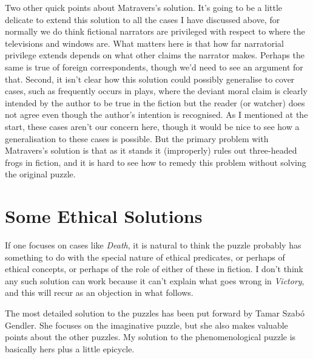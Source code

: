 \documentclass[
  10pt,
  letterpaper,
  DIV=11,
  numbers=noendperiod,
  twoside]{scrartcl}
\begin{document}
Two other quick points about Matravers's solution. It's going to be a
little delicate to extend this solution to all the cases I have
discussed above, for normally we do think fictional narrators are
privileged with respect to where the televisions and windows are. What
matters here is that how far narratorial privilege extends depends on
what other claims the narrator makes. Perhaps the same is true of
foreign correspondents, though we'd need to see an argument for that.
Second, it isn't clear how this solution could possibly generalise to
cover cases, such as frequently occurs in plays, where the deviant moral
claim is clearly intended by the author to be true in the fiction but
the reader (or watcher) does not agree even though the author's
intention is recognised. As I mentioned at the start, these cases aren't
our concern here, though it would be nice to see how a generalisation to
these cases is possible. But the primary problem with Matravers's
solution is that as it stands it (improperly) rules out three-headed
frogs in fiction, and it is hard to see how to remedy this problem
without solving the original puzzle.

\section{Some Ethical Solutions}\label{some-ethical-solutions}

If one focuses on cases like \emph{Death}, it is natural to think the
puzzle probably has something to do with the special nature of ethical
predicates, or perhaps of ethical concepts, or perhaps of the role of
either of these in fiction. I don't think any such solution can work
because it can't explain what goes wrong in \emph{Victory}, and this
will recur as an objection in what follows.

The most detailed solution to the puzzles has been put forward by Tamar
Szabó Gendler. She focuses on the imaginative puzzle, but she also makes
valuable points about the other puzzles. My solution to the
phenomenological puzzle is basically hers plus a little epicycle.
\end{document}
